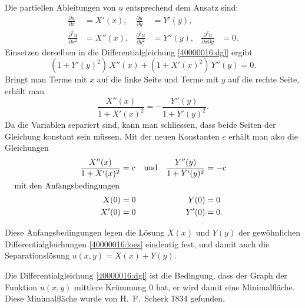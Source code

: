 \begin{loesung}
\begin{teilaufgaben}
\item
Die partiellen Ableitungen von $u$ entsprechend dem Ansatz sind:
\begin{equation*}
\begin{aligned}
\frac{\partial u}{\partial x}
&=
X'(x),
&
\frac{\partial u}{\partial y}
&=
Y'(y),
\\
\frac{\partial^2 u}{\partial x^2}
&=
X''(x),
&
\frac{\partial^2 u}{\partial y^2}
&=
Y''(y),
&
\frac{\partial^2 u}{\partial x\partial y}
&=
0.
\end{aligned}
\end{equation*}
Einsetzen derselben in die Differentialgleichung \eqref{40000016:dgl} 
ergibt
\begin{equation}
(1+Y'(y)^2)\, X''(x) + (1+X'(x)^2)\, Y''(y) = 0.
\end{equation}
Bringt man Terme mit $x$ auf die linke Seite und Terme mit $y$ auf die
rechte Seite, erhält man
\begin{equation}
\frac{X''(x)}{1+X'(x)^2}
=
-\frac{Y''(y)}{1+Y'(y)^2}.
\end{equation}
Da die Variablen separiert sind, kann man schliessen, dass beide Seiten
der Gleichung konstant sein müssen.
Mit der neuen Konstanten $c$ erhält man also die Gleichungen
\begin{align}
\qquad\qquad\qquad\qquad
\frac{X''(x)}{1+X'(x)^2} &= c
&
&\text{und}&
\frac{Y''(y)}{1+Y'(y)^2} &= -c
\qquad\qquad\qquad\qquad
\label{40000016:loes}
\\
\intertext{mit den Anfangsbedingungen}
X(0) &= 0
&&&
Y(0) &= 0
\notag
\\
X'(0) &= 0
&&&
Y'(0) &= 0.
\notag
\end{align}
\item
Diese Anfangsbedingungen legen die Lösung $X(x)$ und $Y(y)$
der gewöhnlichen Differentialgleichungen
\eqref{40000016:loes}
eindeutig
fest, und damit auch die Separationslösung $u(x,y)=X(x) + Y(y)$.
\qedhere
\end{teilaufgaben}
\end{loesung}

\begin{diskussion}
Die Differentialgleichung \eqref{40000016:dgl} ist die Bedingung, dass der
Graph der Funktion $u(x,y)$ mittlere Krümmung $0$ hat, er wird damit eine
Minimalfläche.
Diese Minimalfläche wurde von H.~F.~Scherk 1834 gefunden.
\end{diskussion}
